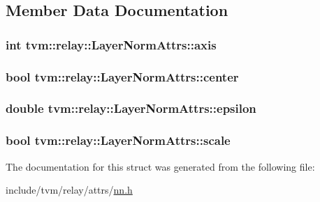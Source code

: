 \subsection{Member Data Documentation}
\subsubsection[{\texorpdfstring{axis}{axis}}]{\setlength{\rightskip}{0pt plus 5cm}int tvm\+::relay\+::\+Layer\+Norm\+Attrs\+::axis}\hypertarget{structtvm_1_1relay_1_1LayerNormAttrs_aa4fbf81a614acfbea404e7d270c83685}{}\label{structtvm_1_1relay_1_1LayerNormAttrs_aa4fbf81a614acfbea404e7d270c83685}
\subsubsection[{\texorpdfstring{center}{center}}]{\setlength{\rightskip}{0pt plus 5cm}bool tvm\+::relay\+::\+Layer\+Norm\+Attrs\+::center}\hypertarget{structtvm_1_1relay_1_1LayerNormAttrs_a013460f687b8751814e5c09d5d2033ae}{}\label{structtvm_1_1relay_1_1LayerNormAttrs_a013460f687b8751814e5c09d5d2033ae}
\subsubsection[{\texorpdfstring{epsilon}{epsilon}}]{\setlength{\rightskip}{0pt plus 5cm}double tvm\+::relay\+::\+Layer\+Norm\+Attrs\+::epsilon}\hypertarget{structtvm_1_1relay_1_1LayerNormAttrs_a5b52e9e6d0616d026896575d8242ef78}{}\label{structtvm_1_1relay_1_1LayerNormAttrs_a5b52e9e6d0616d026896575d8242ef78}
\subsubsection[{\texorpdfstring{scale}{scale}}]{\setlength{\rightskip}{0pt plus 5cm}bool tvm\+::relay\+::\+Layer\+Norm\+Attrs\+::scale}\hypertarget{structtvm_1_1relay_1_1LayerNormAttrs_ac3fd4a906b04ce84722adc3fdf9dfc0b}{}\label{structtvm_1_1relay_1_1LayerNormAttrs_ac3fd4a906b04ce84722adc3fdf9dfc0b}


The documentation for this struct was generated from the following file\+:\begin{DoxyCompactItemize}
\item 
include/tvm/relay/attrs/\hyperlink{include_2tvm_2relay_2attrs_2nn_8h}{nn.\+h}\end{DoxyCompactItemize}
